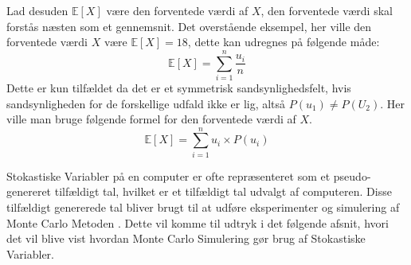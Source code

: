 \documentclass[../../SRP.tex]{subfiles}
\begin{document}
Lad desuden $\mathbb{E}[X]$ være den forventede værdi af $X$, den forventede værdi skal forstås næsten som et gennemsnit. Det overstående eksempel, her ville den forventede værdi $X$ være $\mathbb{E}[X] = 18$, dette kan udregnes på følgende måde:
\begin{equation}
  \mathbb{E}[X] = \sum_{i = 1}^n \frac{u_i}{n}
\end{equation}
Dette er kun tilfældet da det er et symmetrisk sandsynlighedsfelt, hvis sandsynligheden for de forskellige udfald ikke er lig, altså  $P(u_1) \neq P(U_2)$. Her ville man bruge følgende formel for den forventede værdi af $X$.
\begin{equation}
  \mathbb{E}[X] = \sum_{i = 1}^n u_i \times P(u_i)
\end{equation}

Stokastiske Variabler på en computer er ofte repræsenteret som et pseudo-genereret tilfældigt tal, hvilket er et tilfældigt tal udvalgt af computeren. Disse tilfældigt genererede tal bliver brugt til at udføre eksperimenter og simulering af Monte Carlo Metoden \cite{SBM}. Dette vil komme til udtryk i det følgende afsnit, hvori det vil blive vist hvordan Monte Carlo Simulering gør brug af Stokastiske Variabler. 
\end{document}

